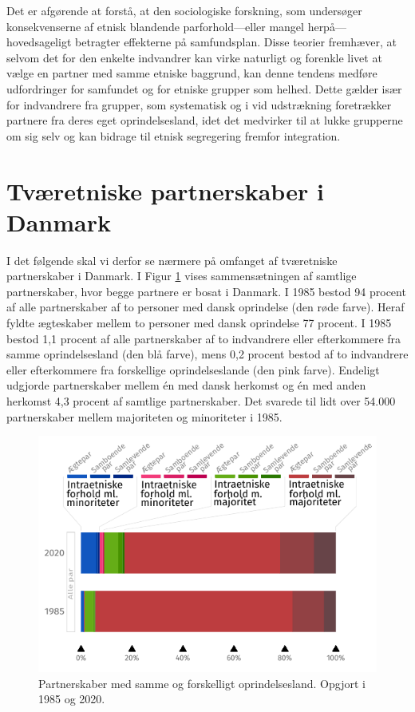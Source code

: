 \documentclass[
]{book}
\begin{document}
Det er afgørende at forstå, at den sociologiske forskning, som undersøger konsekvenserne af etnisk blandende parforhold---eller mangel herpå---hovedsageligt betragter effekterne på samfundsplan. Disse teorier fremhæver, at selvom det for den enkelte indvandrer kan virke naturligt og forenkle livet at vælge en partner med samme etniske baggrund, kan denne tendens medføre udfordringer for samfundet og for etniske grupper som helhed. Dette gælder især for indvandrere fra grupper, som systematisk og i vid udstrækning foretrækker partnere fra deres eget oprindelsesland, idet det medvirker til at lukke grupperne om sig selv og kan bidrage til etnisk segregering fremfor integration.

\section{Tværetniske partnerskaber i Danmark}\label{tvuxe6retniske-partnerskaber-i-danmark}

I det følgende skal vi derfor se nærmere på omfanget af tværetniske partnerskaber i Danmark. I Figur \ref{fig:fig-2-1} vises sammensætningen af samtlige partnerskaber, hvor begge partnere er bosat i Danmark. I 1985 bestod 94 procent af alle partnerskaber af to personer med dansk oprindelse (den røde farve). Heraf fyldte ægteskaber mellem to personer med dansk oprindelse 77 procent. I 1985 bestod 1,1 procent af alle partnerskaber af to indvandrere eller efterkommere fra samme oprindelsesland (den blå farve), mens 0,2 procent bestod af to indvandrere eller efterkommere fra forskellige oprindelseslande (den pink farve). Endeligt udgjorde partnerskaber mellem én med dansk herkomst og én med anden herkomst 4,3 procent af samtlige partnerskaber. Det svarede til lidt over 54.000 partnerskaber mellem majoriteten og minoriteter i 1985.

\begin{figure}

{\centering \includegraphics[width=0.75\linewidth]{images/figur_intergruppepartnerskaber_alle} 

}

\caption{ Partnerskaber med samme og forskelligt oprindelsesland. Opgjort i 1985 og 2020.}\label{fig:fig-2-1}
\end{figure}
\end{document}
